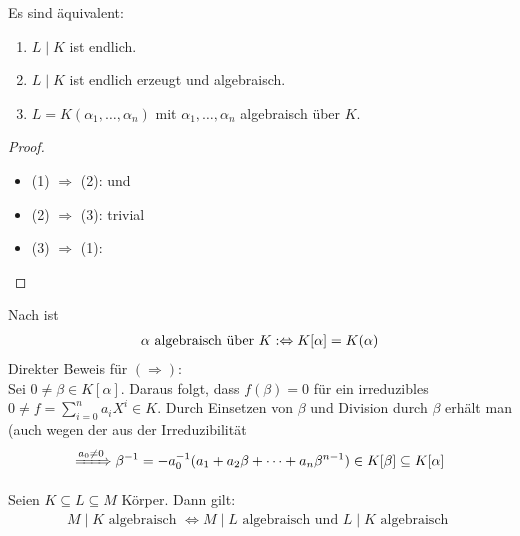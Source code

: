 
\begin{conclusion}
	Es sind äquivalent:
	\begin{enumerate}[label=(\alph*)]
		\item $L \mid K$ ist endlich.
		\item $L \mid K$ ist endlich erzeugt und algebraisch.
		\item $L = K(\alpha_1, \dots , \alpha_n)$ mit $\alpha_1, \dots, \alpha_n$ algebraisch über $K$.
	\end{enumerate}
\end{conclusion}

\begin{proof}
	\begin{itemize}
		\item (1) $\Rightarrow$ (2):  und 
		\item (2) $\Rightarrow$ (3): trivial
		\item (3) $\Rightarrow$ (1): 
	\end{itemize}
\end{proof}

\begin{remark}
	Nach  ist
	\begin{align}
	\alpha \text{ algebraisch über } K :\Leftrightarrow K[\alpha] = K(\alpha) \notag
	\end{align}
	Direkter Beweis für $(\Rightarrow)$: \\
	Sei $0 \neq \beta \in K[\alpha]$. Daraus folgt, dass $f(\beta) = 0$ für ein irreduzibles $0 \neq f = \sum_{i=0}^n a_i X^i \in K$. Durch Einsetzen von $\beta$ und Division durch $\beta$ erhält man (auch wegen der aus der Irreduzibilität
	\begin{align}
	\xRightarrow{a_0 \neq 0}\beta^{-1} = -a_0^{-1} ( a_1 + a_2 \beta + \dots + a_n \beta^{n-1}) \in K[\beta] \subseteq K[\alpha] \notag
	\end{align}
\end{remark}
\begin{proposition}
	Seien $K \subseteq L \subseteq M$ Körper. Dann gilt:
	\begin{align*}
		M\mid K \text{ algebraisch } \Leftrightarrow M\mid L \text{ algebraisch und } L \mid K \text{ algebraisch }
	\end{align*}
\end{proposition}

